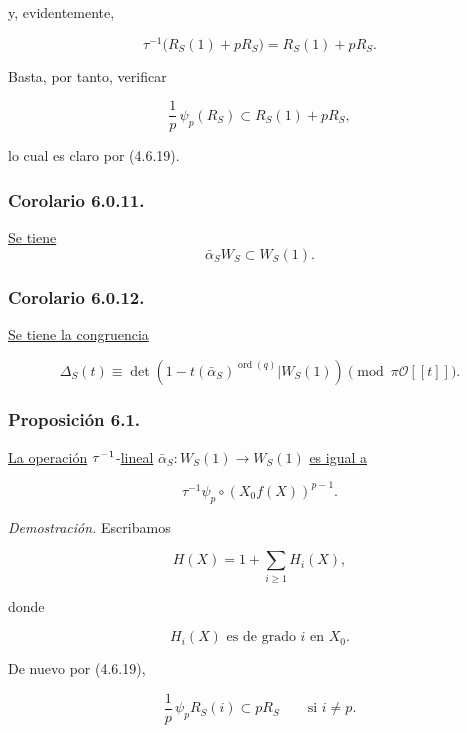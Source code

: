 y, evidentemente,

\begin{equation}\tag{6.0.9}
\tau^{-1}\bigl(R_S(1)+pR_S\bigr)=R_S(1)+pR_S.
\end{equation}

Basta, por tanto, verificar

\begin{equation}\tag{6.0.10}
\frac1p\,\psi_p(R_S)\subset R_S(1)+pR_S,
\end{equation}

lo cual es claro por (4.6.19).

\subsubsection*{Corolario 6.0.11.}
\underline{Se tiene}
\[
\bar\alpha_S W_S\subset W_S(1).
\]

\pageoriginale

\subsubsection*{Corolario 6.0.12.}
\underline{Se tiene la congruencia}

\[
\Delta_S(t)\equiv
\det\!\left(
1-t(\bar\alpha_S)^{\operatorname{ord}(q)}
\mathrel{\Big|}W_S(1)\right)
\pmod{\pi\mathcal O[[t]]}.
\]

\subsubsection*{Proposición 6.1.}
\underline{La operación} $\sisi{\tau^{1}}{\tau^{-1}}$-\underline{lineal}
$\bar\alpha_S:W_S(1)\to W_S(1)$ \underline{es igual a}

\begin{equation}\tag{6.1.1}
\tau^{-1}\psi_p\circ(X_0f(X))^{p-1}.
\end{equation}

\noindent\emph{Demostración.}
Escribamos

\begin{equation}\tag{6.1.2}
H(X)=1+\sum_{i\geq1}H_i(X),
\end{equation}

donde

\begin{equation}\tag{6.1.3}
H_i(X)\text{ es de grado $i$ en }X_0.
\end{equation}

De nuevo por (4.6.19),

\begin{equation}\tag{6.1.4}
\frac1p\,\psi_pR_S(i)\subset pR_S
\qquad\text{si }i\ne p.
\end{equation}

